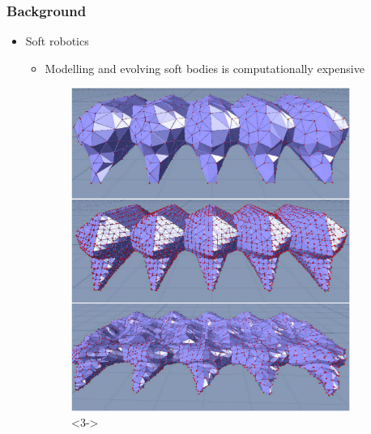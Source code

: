 \documentclass[serif, pdf]{beamer}
\begin{document}

\begin{frame}
    \frametitle{Background}
    \begin{itemize}
        \item<1-> Soft robotics
        \changefontsizes{11pt}
        \begin{itemize}
            \item<2-> Modelling and evolving soft bodies is computationally expensive
        \end{itemize}
    \end{itemize}
    \begin{figure}[ht!]
        \captionsetup{skip=0.333\baselineskip}
        \centering
        \begin{subfigure}{.23\textwidth}
            \includegraphics[width=1\linewidth]{Rieffel.png}<3->%
        \end{subfigure}
        \begin{subfigure}{.23\textwidth}

\end{subfigure}
\end{figure}
\end{frame}
\end{document}

